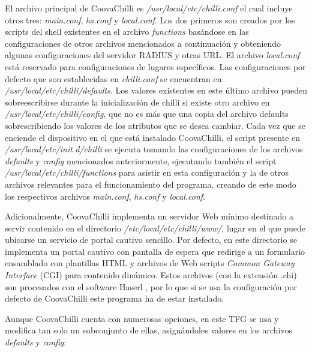 El archivo principal de CoovaChilli es  \emph{/usr/local/etc/chilli.conf} el cual incluye otros tres: \emph{main.conf}, \emph{hs.conf} y \emph{local.conf}. Los dos primeros son creados por los scripts del shell existentes en el archivo \emph{functions} basándose en las configuraciones de otros archivos mencionados a continuación y obteniendo algunas configuraciones del servidor RADIUS y otras \acrshort{URL}. El archivo \emph{local.conf} está reservado para configuraciones de lugares específicos.
Las configuraciones por defecto que son establecidas en \emph{chilli.conf} se encuentran en \emph{/usr/local/etc/chilli/defaults}. Los valores existentes en este último archivo pueden sobreescribirse durante la inicialización de chilli si existe otro archivo en \emph{/usr/local/etc/chilli/config}, que no es más que una copia del archivo defaults sobrescribiendo los valores de los atributos que se desea cambiar.
Cada vez que se enciende el dispositivo en el que está instalado CoovaChilli, el script presente en \emph{/usr/local/etc/init.d/chilli} se ejecuta tomando las configuraciones de los archivos \emph{defaults} y \emph{config} mencionados anteriormente, ejecutando también el script \emph{/usr/local/etc/chilli/functions} para asistir en esta configuración y la de otros archivos relevantes para el funcionamiento del programa, creando de este modo los respectivos archivos \emph{main.conf}, \emph{hs.conf} y \emph{local.conf}.

Adicionalmente, CoovaChilli implementa un servidor Web mínimo destinado a servir contenido en el directorio \emph{/etc/local/etc/chilli/www/}, lugar en el que puede ubicarse un servicio de portal cautivo sencillo. Por defecto, en este directorio se implementa un portal cautivo con pantalla de espera que redirige a un formulario ensamblado con plantillas HTML y archivos de Web scripts \emph{Common Gateway Interface} (\acrshort{CGI}) para contenido dinámico. Estos archivos (con la extensión .chi) son procesados con el software Haserl \cite{Haserl}, por lo que si se usa la configuración por defecto de CoovaChilli este programa ha de estar instalado.

Aunque CoovaChilli cuenta con numerosas opciones, en este TFG se usa y modifica tan solo un subconjunto de ellas, asignándoles valores en los archivos \emph{defaults} y \emph{config}:

